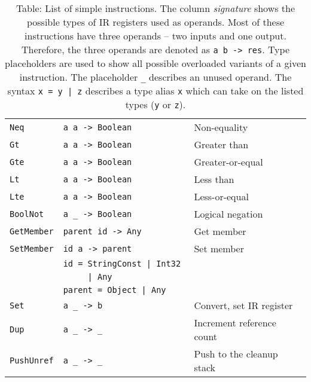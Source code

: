 \begin{table}
\begin{tabular}{l | l | l}
        \texttt{Neq}         & \texttt{a      a     -> Boolean  } &  Non-equality               \\
        \texttt{Gt}          & \texttt{a      a     -> Boolean  } &  Greater than               \\
        \texttt{Gte}         & \texttt{a      a     -> Boolean  } &  Greater-or-equal           \\
        \texttt{Lt}          & \texttt{a      a     -> Boolean  } &  Less than                  \\
        \texttt{Lte}         & \texttt{a      a     -> Boolean  } &  Less-or-equal              \\
        \texttt{BoolNot}     & \texttt{a      \_    -> Boolean  } &  Logical negation           \\\hline
        \texttt{GetMember}   & \texttt{parent id    -> Any      } &  Get member                 \\
        \texttt{SetMember}   & \texttt{id     a     -> parent   } &  Set member                 \\
                             & \texttt{id = StringConst | Int32 } &                             \\
                             & \texttt{~~~~~| Any                 } &                             \\
                             & \texttt{parent = Object | Any    } &                             \\\hline
        \texttt{Set}         & \texttt{a      \_    -> b        } &  Convert, set IR register   \\
        \texttt{Dup}         & \texttt{a      \_    -> \_       } &  Increment reference count  \\
        \texttt{PushUnref}   & \texttt{a      \_    -> \_       } &  Push to the cleanup stack  \\
    \end{tabular}
    \caption{Table: List of simple instructions. The column \textit{signature} shows the possible types of IR registers used as operands. Most of these instructions have three operands -- two inputs and one output. Therefore, the three operands are denoted as \texttt{a b -> res}. Type placeholders are used to show all possible overloaded variants of a given instruction. The placeholder \texttt{\_} describes an unused operand. The syntax \texttt{x = y | z} describes a type alias \texttt{x} which can take on the listed types (\texttt{y} or \texttt{z}). }
    \label{tab:opcodes}
\end{table}


